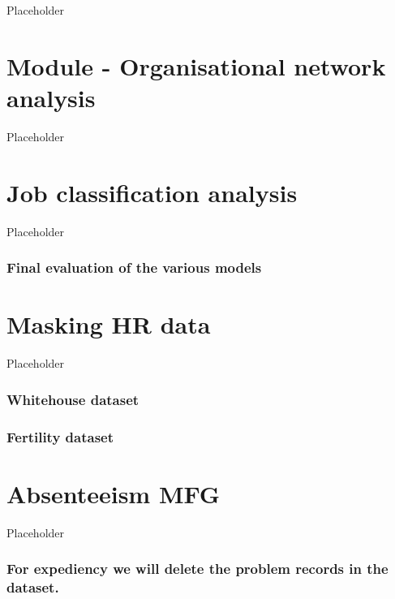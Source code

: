 \documentclass[
  12pt, krantz2,
]{krantz}
\begin{document}
Placeholder

\hypertarget{orgnisational-network}{%
\chapter{Module - Organisational network analysis}\label{orgnisational-network}}

Placeholder

\hypertarget{job-classification}{%
\chapter{Job classification analysis}\label{job-classification}}

Placeholder

\hypertarget{final-evaluation-of-the-various-models}{%
\subsection{Final evaluation of the various models}\label{final-evaluation-of-the-various-models}}

\hypertarget{masking-data}{%
\chapter{Masking HR data}\label{masking-data}}

Placeholder

\hypertarget{whitehouse-dataset}{%
\subsection{Whitehouse dataset}\label{whitehouse-dataset}}

\hypertarget{fertility-dataset}{%
\subsection{Fertility dataset}\label{fertility-dataset}}

\hypertarget{absenteeism-MFG}{%
\chapter{Absenteeism MFG}\label{absenteeism-MFG}}

Placeholder

\hypertarget{for-expediency-we-will-delete-the-problem-records-in-the-dataset.}{%
\subsection{For expediency we will delete the problem records in the dataset.}\label{for-expediency-we-will-delete-the-problem-records-in-the-dataset.}}
\end{document}
